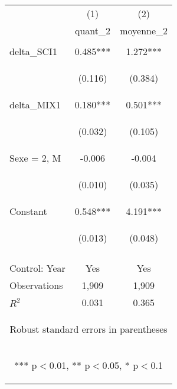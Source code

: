 \begin{center}
\begin{tabular}{lcc} \hline
 & (1) & (2) \\
& quant\_2 & moyenne\_2 \\ \hline
\vspace{4pt} & \begin{footnotesize}\end{footnotesize} & \begin{footnotesize}\end{footnotesize} \\
delta\_SCI1 & 0.485*** & 1.272*** \\
\vspace{4pt} & \begin{footnotesize}(0.116)\end{footnotesize} & \begin{footnotesize}(0.384)\end{footnotesize} \\
delta\_MIX1 & 0.180*** & 0.501*** \\
\vspace{4pt} & \begin{footnotesize}(0.032)\end{footnotesize} & \begin{footnotesize}(0.105)\end{footnotesize} \\
Sexe = 2, M & -0.006 & -0.004 \\
\vspace{4pt} & \begin{footnotesize}(0.010)\end{footnotesize} & \begin{footnotesize}(0.035)\end{footnotesize} \\
Constant & 0.548*** & 4.191*** \\
 & \begin{footnotesize}(0.013)\end{footnotesize} & \begin{footnotesize}(0.048)\end{footnotesize} \\
\vspace{4pt} & \begin{footnotesize}\end{footnotesize} & \begin{footnotesize}\end{footnotesize} \\
Control: Year & Yes & Yes \\ \hline
Observations & 1,909 & 1,909 \\
 $R^2$ & 0.031 & 0.365 \\ \hline
\multicolumn{3}{c}{\begin{footnotesize} Robust standard errors in parentheses\end{footnotesize}} \\
\multicolumn{3}{c}{\begin{footnotesize} *** p$<$0.01, ** p$<$0.05, * p$<$0.1\end{footnotesize}} \\
\end{tabular}
\end{center}
